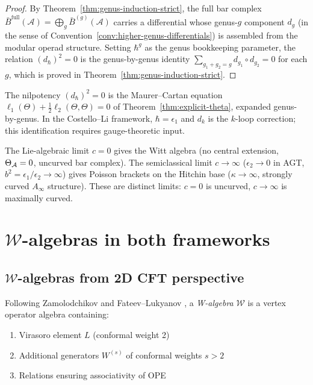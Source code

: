 \begin{proof}
By Theorem~\ref{thm:genus-induction-strict}, the full bar complex
$\bar{B}^{\mathrm{full}}(\mathcal{A}) = \bigoplus_g \bar{B}^{(g)}(\mathcal{A})$
carries a differential whose genus-$g$ component $d_g$ (in the sense of Convention~\ref{conv:higher-genus-differentials}) is assembled from
the modular operad structure.  Setting $\hbar^g$ as the genus bookkeeping
parameter, the relation $(d_\hbar)^2 = 0$ is the genus-by-genus
identity $\sum_{g_1 + g_2 = g} d_{g_1} \circ d_{g_2} = 0$
for each $g$, which is proved in Theorem~\ref{thm:genus-induction-strict}.
\end{proof}

\begin{remark}
The nilpotency $(d_\hbar)^2 = 0$ is the Maurer--Cartan equation $\ell_1(\Theta) + \tfrac{1}{2}\ell_2(\Theta, \Theta) = 0$ of Theorem~\ref{thm:explicit-theta}, expanded genus-by-genus.  In the Costello--Li framework, $\hbar = \epsilon_1$ and $d_k$ is the $k$-loop correction; this identification requires gauge-theoretic input.
\end{remark}

\begin{example}
The Lie-algebraic limit $c = 0$ gives the Witt algebra (no central extension, $\Theta_{\mathcal{A}} = 0$, uncurved bar complex).  The semiclassical limit $c \to \infty$ ($\epsilon_2 \to 0$ in AGT, $b^2 = \epsilon_1/\epsilon_2 \to \infty$) gives Poisson brackets on the Hitchin base ($\kappa \to \infty$, strongly curved $A_\infty$ structure).  These are distinct limits: $c = 0$ is uncurved, $c \to \infty$ is maximally curved.
\end{example}


\section{$\mathcal{W}$-algebras in both frameworks}
\label{sec:w-algebras-unifying}

\subsection{$\mathcal{W}$-algebras from 2D CFT perspective}

\begin{definition}\label{def:w-algebra-cft}
Following Zamolodchikov \cite{Zamolodchikov} and Fateev--Lukyanov \cite{FL88}, a 
\emph{W-algebra} $\mathcal{W}$ is a vertex operator algebra containing:
\begin{enumerate}
\item Virasoro element $L$ (conformal weight 2)
\item Additional generators $W^{(s)}$ of conformal weights $s > 2$
\item Relations ensuring associativity of OPE
\end{enumerate}
\end{definition}

